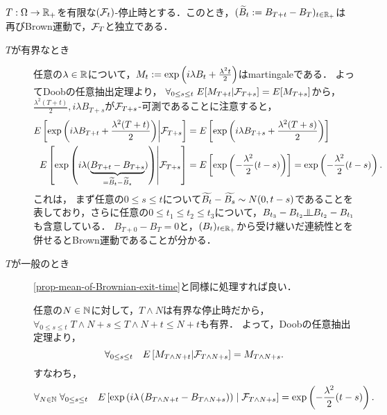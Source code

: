 \documentclass[uplatex,dvipdfmx]{jsreport}
\begin{document}
\begin{theorem}\mbox{}\\
    $T:\Omega\to\mathbb{R}_+$を有限な$(\mathcal{F}_t)$-停止時とする．このとき，$(\widetilde{B}_t:=B_{T+t}-B_T)_{t\in\mathbb{R}_+}$は再びBrown運動で，$\mathcal{F}_T$と独立である．
\end{theorem}
\begin{Proof}\mbox{}
    \begin{description}
        \item[$T$が有界なとき]
        任意の$\lambda\in\mathbb{R}$について，$M_t:=\exp\left(i\lambda B_t+\frac{\lambda^2t}{2}\right)$はmartingaleである．
        よってDoobの任意抽出定理より，
        $\forall_{0\le s\le t}\;E[M_{T+t}|\mathcal{F}_{T+s}]=E[M_{T+s}]$から，$\frac{\lambda^2(T+t)}{2},i\lambda B_{T+s}$が$\mathcal{F}_{T+s}$-可測であることに注意すると，
        \begin{align*}
            E\left[\exp\left(i\lambda B_{T+t}+\frac{\lambda^2(T+t)}{2}\right)\middle|\mathcal{F}_{T+s}\right]&=E\left[\exp\left(i\lambda B_{T+s}+\frac{\lambda^2(T+s)}{2}\right)\right]\\
            E\left[\exp\left(i\lambda(\underbrace{B_{T+t}-B_{T+s}}_{=\widetilde{B}_t-\widetilde{B}_s})\right)\middle|\mathcal{F}_{T+s}\right]&=E\left[\exp\left(-\frac{\lambda^2}{2}(t-s)\right)\right]=\exp\left(-\frac{\lambda^2}{2}(t-s)\right).
        \end{align*}
        これは，
        まず任意の$0\le s\le t$について$\widetilde{B_t}-\widetilde{B_s}\sim N(0,t-s)$であることを表しており，さらに任意の$0\le t_1\le t_2\le t_3$について，$B_{t_3}-B_{t_2}\indep B_{t_2}-B_{t_1}$も含意している．
        $B_{T+0}-B_T=0$と，$(B_t)_{t\in\mathbb{R}_+}$から受け継いだ連続性とを併せるとBrown運動であることが分かる．
        \item[$T$が一般のとき] \ref{prop-mean-of-Brownian-exit-time}と同様に処理すれば良い．
        
        任意の$N\in\mathbb{N}$に対して，$T\land N$は有界な停止時だから，$\forall_{0\le s\le t}\;T\land N+s\le T\land N+t\le N+t$も有界．
        よって，Doobの任意抽出定理より，
        \[\forall_{0\le s\le t}\quad E\left[M_{T\land N+t}|\mathcal{F}_{T\land N+s}\right]=M_{T\land N+s}.\]
        すなわち，
        \[\forall_{N\in\mathbb{N}}\;\forall_{0\le s\le t}\quad E\left[\exp\left(i\lambda\left(B_{T\land N+t}-B_{T\land N+s}\right)\right)\;\middle|\;\mathcal{F}_{T\land N+s}\right]=\exp\left(-\frac{\lambda^2}{2}(t-s)\right).\]


\end{description}
\end{Proof}
\end{document}
